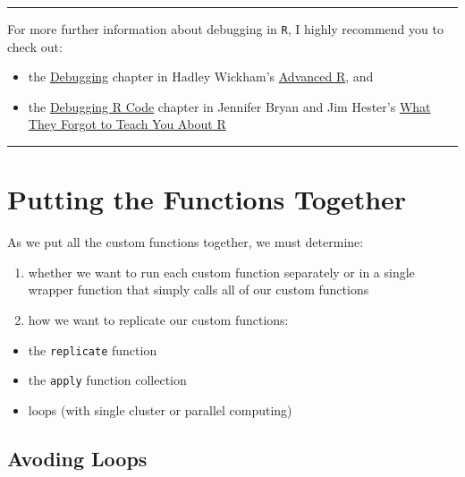 \documentclass[
]{book}
\providecommand{\tightlist}{%
  \setlength{\itemsep}{0pt}\setlength{\parskip}{0pt}}
\begin{document}
\begin{center}\rule{0.5\linewidth}{0.5pt}\end{center}

For more further information about debugging in \texttt{R}, I highly recommend you to check out:

\begin{itemize}
\tightlist
\item
  the \href{https://adv-r.hadley.nz/debugging.html}{Debugging} chapter in Hadley Wickham's \href{https://adv-r.hadley.nz/}{Advanced R}, and
\item
  the \href{https://rstats.wtf/debugging-r-code.html}{Debugging R Code} chapter in Jennifer Bryan and Jim Hester's \href{https://rstats.wtf/}{What They Forgot to Teach You About R}
\end{itemize}

\begin{center}\rule{0.5\linewidth}{0.5pt}\end{center}

\hypertarget{putting-the-functions-together}{%
\section{Putting the Functions Together}\label{putting-the-functions-together}}

As we put all the custom functions together, we must determine:

\begin{enumerate}
\def\labelenumi{\arabic{enumi}.}
\tightlist
\item
  whether we want to run each custom function separately or in a single wrapper function that simply calls all of our custom functions
\item
  how we want to replicate our custom functions:
\end{enumerate}

\begin{itemize}
\tightlist
\item
  the \texttt{replicate} function
\item
  the \texttt{apply} function collection
\item
  loops (with single cluster or parallel computing)
\end{itemize}

\hypertarget{avoding-loops}{%
\subsection{Avoding Loops}\label{avoding-loops}}
\end{document}
